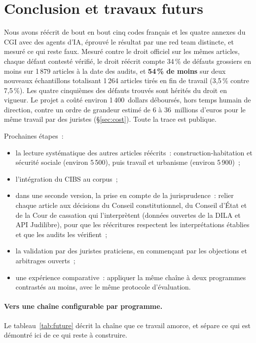 \documentclass[11pt,a4paper]{article}
\begin{document}
\section{Conclusion et travaux futurs}

Nous avons réécrit de bout en bout cinq codes français et les quatre annexes du CGI avec des agents d'IA, éprouvé le résultat par une red team distincte, et mesuré ce qui reste faux. Mesuré contre le droit officiel sur les mêmes articles, chaque défaut contesté vérifié, le droit réécrit compte 34\,\% de défauts grossiers en moins sur 1\,879 articles à la date des audits, et \textbf{54\,\% de moins} sur deux nouveaux échantillons totalisant 1\,264 articles tirés en fin de travail (3,5\,\% contre 7,5\,\%). Les quatre cinquièmes des défauts trouvés sont hérités du droit en vigueur. Le projet a coûté environ 1\,400~dollars déboursés, hors temps humain de direction, contre un ordre de grandeur estimé de 6 à 36~millions d'euros pour le même travail par des juristes (\S\ref{sec:cost}). Toute la trace est publique.

Prochaines étapes~:
\begin{itemize}
  \item la lecture systématique des autres articles réécrits~: construction-habitation et sécurité sociale (environ 5\,500), puis travail et urbanisme (environ 5\,900)~;
  \item l'intégration du CIBS au corpus~;
  \item dans une seconde version, la prise en compte de la jurisprudence~: relier chaque article aux décisions du Conseil constitutionnel, du Conseil d'État et de la Cour de cassation qui l'interprètent (données ouvertes de la DILA et API Judilibre), pour que les réécritures respectent les interprétations établies et que les audits les vérifient~;
  \item la validation par des juristes praticiens, en commençant par les objections et arbitrages ouverts~;
  \item une expérience comparative~: appliquer la même chaîne à deux programmes contrastés au moins, avec le même protocole d'évaluation.
\end{itemize}

\paragraph{Vers une chaîne configurable par programme.}
Le tableau~\ref{tab:future} décrit la chaîne que ce travail amorce, et sépare ce qui est démontré ici de ce qui reste à construire.
\end{document}
